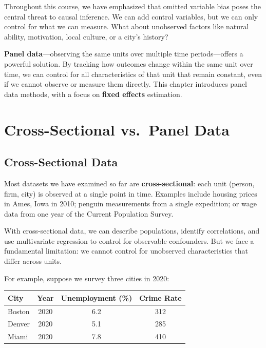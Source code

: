 \documentclass[
  letterpaper,
  DIV=11,
  numbers=noendperiod]{scrreprt}
\newcounter{none} %
\begin{document}
Throughout this course, we have emphasized that omitted variable bias
poses the central threat to causal inference. We can add control
variables, but we can only control for what we can measure. What about
unobserved factors like natural ability, motivation, local culture, or a
city's history?

\textbf{Panel data}---observing the same units over multiple time
periods---offers a powerful solution. By tracking how outcomes change
within the same unit over time, we can control for all characteristics
of that unit that remain constant, even if we cannot observe or measure
them directly. This chapter introduces panel data methods, with a focus
on \textbf{fixed effects} estimation.

\section{Cross-Sectional vs.~Panel
Data}\label{cross-sectional-vs.-panel-data}

\subsection{Cross-Sectional Data}\label{cross-sectional-data}

Most datasets we have examined so far are \textbf{cross-sectional}: each
unit (person, firm, city) is observed at a single point in time.
Examples include housing prices in Ames, Iowa in 2010; penguin
measurements from a single expedition; or wage data from one year of the
Current Population Survey.

With cross-sectional data, we can describe populations, identify
correlations, and use multivariate regression to control for observable
confounders. But we face a fundamental limitation: we cannot control for
unobserved characteristics that differ across units.

For example, suppose we survey three cities in 2020:

{\def\LTcaptype{none} %
\begin{longtable}[]{@{}lccc@{}}
\toprule\noalign{}
City & Year & Unemployment (\%) & Crime Rate \\
\midrule\noalign{}
\endhead
\bottomrule\noalign{}
\endlastfoot
Boston & 2020 & 6.2 & 312 \\
Denver & 2020 & 5.1 & 285 \\
Miami & 2020 & 7.8 & 410 \\
\end{longtable}
}
\end{document}
